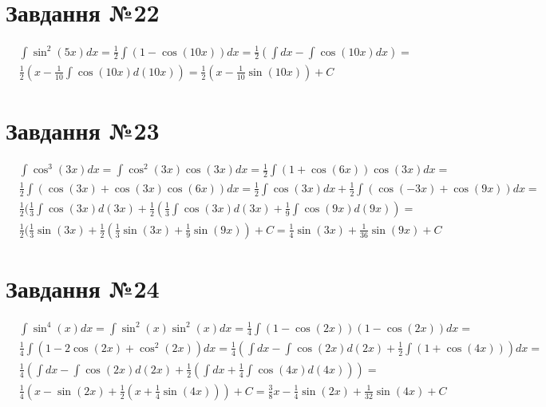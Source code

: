 \documentclass{report}
\begin{document}
\section{Завдання №22}
\begin{equation}\begin{split}
	& \int \sin^2(5x)dx = \frac{1}{2}\int(1 - \cos (10x))dx = \frac{1}{2}(\int dx - \int\cos(10x)dx) =\\
	& \frac{1}{2}(x - \frac{1}{10}\int\cos(10x)d(10x)) = \frac{1}{2}(x - \frac{1}{10}\sin(10x)) + C
\end{split}\end{equation}

\section{Завдання №23}
\begin{equation}\begin{split}
	& \int \cos^3(3x)dx = \int \cos^2(3x)\cos(3x)dx = \frac{1}{2}\int(1+\cos(6x))\cos(3x)dx =\\
	& \frac{1}{2}\int(\cos(3x) + \cos(3x)\cos(6x))dx = \frac{1}{2}\int\cos(3x)dx + \frac{1}{2}\int(\cos(-3x) + \cos(9x))dx =\\
	& \frac{1}{2}(\frac{1}{3}\int\cos(3x)d(3x) + \frac{1}{2}(\frac{1}{3}\int\cos(3x)d(3x) + \frac{1}{9}\int\cos(9x)d(9x)) =\\
	& \frac{1}{2}(\frac{1}{3}\sin(3x) + \frac{1}{2}(\frac{1}{3}\sin(3x) + \frac{1}{9}\sin(9x)) + C = \frac{1}{4}\sin(3x) + \frac{1}{36}\sin(9x) + C
\end{split}\end{equation}

\section{Завдання №24}
\begin{equation}\begin{split}
	& \int \sin^4(x)dx = \int \sin^2(x)\sin^2(x)dx = \frac{1}{4}\int(1 - \cos(2x))(1 - \cos(2x))dx =\\
	& \frac{1}{4}\int(1 - 2\cos(2x) + \cos^2(2x))dx = \frac{1}{4}(\int dx - \int\cos(2x)d(2x) + \frac{1}{2}\int(1 + \cos(4x)))dx =\\
	& \frac{1}{4}(\int dx - \int\cos(2x)d(2x) + \frac{1}{2}(\int dx + \frac{1}{4}\int\cos(4x)d(4x))) =\\
	& \frac{1}{4}(x - \sin(2x) + \frac{1}{2}(x + \frac{1}{4}\sin(4x))) + C = \frac{3}{8}x - \frac{1}{4}\sin(2x) + \frac{1}{32}\sin(4x) + C
\end{split}\end{equation}
\end{document}
